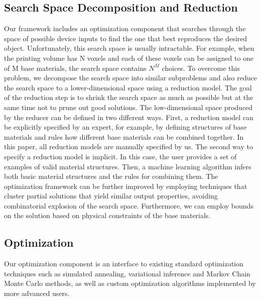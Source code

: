 \documentclass[annual]{acmsiggraph}
\begin{document}
\subsection{Search Space Decomposition and Reduction}
Our framework includes an optimization component that
searches through the space of possible device inputs
to find the one that best reproduces
the desired object. Unfortunately, this search space
is usually intractable. For example, when the printing
volume has N voxels and each of these voxels can be
assigned to one of M base materials, the search space
contains $N^M$ choices. To overcome this problem, we decompose the search
space into similar subproblems and also reduce
the search space to a lower-dimensional space using
a reduction model. The goal of the reduction step is to
shrink the search space as much as possible but at the
same time not to prune out good solutions. The low-dimensional space produced by the
reducer can be defined in two different ways. First, a reduction model can be explicitly specified by an expert, for
example, by defining structures of base materials and rules how different base materials can be combined together.
In this paper, all reduction models are manually specified by us.
The second way to specify a reduction model is implicit. In this case, the user provides a set of examples of
valid material structures. Then, a machine learning algorithm infers both basic material structures and the rules
for combining them. The optimization framework can be further improved by employing techniques that cluster
partial solutions that yield similar output properties, avoiding combinatorial explosion of the search space.
Furthermore, we can employ bounds on the solution based on physical constraints of the base materials.
\subsection{Optimization}
Our optimization component is an interface to
existing standard optimization techniques
such as simulated annealing, variational inference and
Markov Chain Monte Carlo methods,
as well as custom optimization algorithms implemented
by more advanced users.
\end{document}
